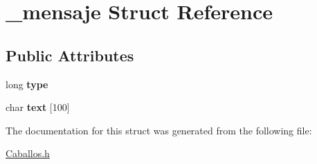 \hypertarget{struct__mensaje}{}\section{\+\_\+mensaje Struct Reference}
\label{struct__mensaje}
\subsection*{Public Attributes}
\begin{DoxyCompactItemize}
\item 
long {\bfseries type}\hypertarget{struct__mensaje_ad54b47a8257574e7f71e6c0d745d1372}{}\label{struct__mensaje_ad54b47a8257574e7f71e6c0d745d1372}

\item 
char {\bfseries text} \mbox{[}100\mbox{]}\hypertarget{struct__mensaje_a16fe0af441941d32abf36eb117a12440}{}\label{struct__mensaje_a16fe0af441941d32abf36eb117a12440}

\end{DoxyCompactItemize}


The documentation for this struct was generated from the following file\+:\begin{DoxyCompactItemize}
\item 
\hyperlink{Caballos_8h}{Caballos.\+h}\end{DoxyCompactItemize}
